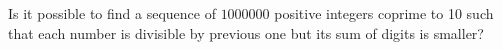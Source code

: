 \problem
Is it possible to find a sequence of $1000000$ positive integers coprime to
10 such that each number is divisible by previous one but its sum of digits is
smaller?

\solution

\endproblem
